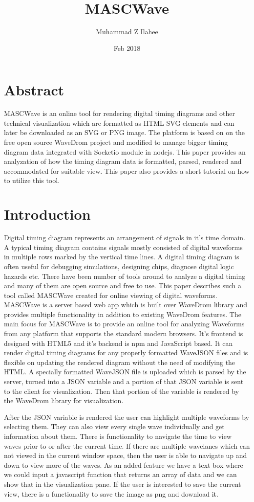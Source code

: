 \documentclass[14pt]{extarticle}
\title{MASCWave}
\author{Muhammad Z Ilahee }
\date{Feb 2018}
\begin{document}
\maketitle
\section{Abstract}
MASCWave is an online tool for rendering digital timing diagrams and other technical visualization which are formatted as HTML SVG elements and can later be downloaded as an SVG or PNG image. The platform is based on on the free open source WaveDrom project and modified to manage bigger timing diagram data integrated with Socketio module in nodejs. This paper provides an analyzation of how the timing diagram data is formatted, parsed, rendered and accommodated for suitable view. This paper also provides a short tutorial on how to utilize this tool. 
\newpage

\section{Introduction}
 Digital timing diagram represents an arrangement of signals in it’s time domain. A typical timing diagram contains signals mostly consisted of digital waveforms in multiple rows marked by the vertical time lines. A digital timing diagram is often useful for debugging simulations, designing chips, diagnose digital logic hazards etc. There have been number of tools around to analyze a digital timing and many of them are open source and free to use. This paper describes such a tool called MASCWave created for online viewing of digital waveforms. MASCWave is a server based web app which is built over WaveDrom library and provides multiple functionality in addition to existing WaveDrom features. The main focus for MASCWave is to provide an online tool for analyzing Waveforms from any platform that supports the standard modern browsers. It’s frontend is designed with HTML5 and it’s backend is npm and JavaScript based. It can render digital timing diagrams for any properly formatted WaveJSON files and is flexible on updating the rendered diagram without the need of modifying the HTML. A specially formatted WaveJSON file is uploaded which is parsed by the server, turned into a  JSON variable and a portion of that JSON variable is sent to the client for visualization. Then that portion of the variable is rendered by the WaveDrom library for visualization.

 After the JSON variable is rendered the user can highlight multiple waveforms by selecting them. They can also view every single wave individually and get information about them. There is functionality to navigate the time to view waves prior to or after the current time. If there are multiple wavelanes which can not viewed in the current window space, then the user is able to navigate up and down to view more of the waves. As an added feature we have a text box where we could input a javascript function that returns an array of data and we can show that in the visualization pane. If the user is interested to save the current view, there is a functionality to save the image as png and download it.
 
\end{document}
